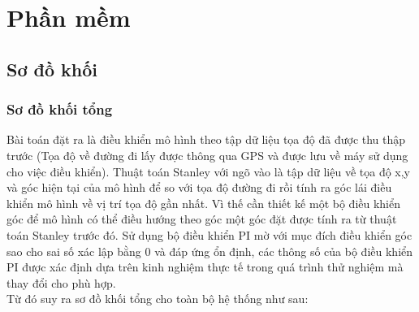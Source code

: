 \documentclass[a4paper, 12pt]{article}
\begin{document}
	\newpage
	\section{Phần mềm}
	\subsection{Sơ đồ khối}
	\subsubsection{Sơ đồ khối tổng}
	\hspace{0.5cm}
	Bài toán đặt ra là điều khiển mô hình theo tập dữ liệu tọa độ đã được thu thập trước (Tọa độ về đường đi lấy được thông qua GPS và được lưu về máy sử dụng cho việc điều khiển). Thuật toán Stanley với ngõ vào là tập dữ liệu về tọa độ x,y và góc hiện tại của mô hình để so với tọa độ đường đi rồi tính ra góc lái điều khiển mô hình về vị trí tọa độ gần nhất. Vì thế cần thiết kế một bộ điều khiển góc để mô hình có thể điều hướng theo góc một góc đặt được tính ra từ thuật toán Stanley trước đó. Sử dụng bộ điều khiển PI mờ với mục đích điều khiển góc sao cho sai số xác lập bằng 0 và đáp ứng ổn định, các thông số của bộ điều khiển PI được xác định dựa trên kinh nghiệm thực tế trong quá trình thử nghiệm mà thay đổi cho phù hợp. \\\indent
	Từ đó suy ra sơ đồ khối tổng cho toàn bộ hệ thống như sau:\\\newpage
\end{document}
